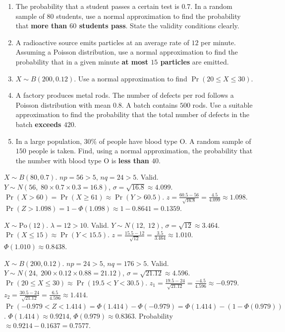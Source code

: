 \documentclass[11pt]{article}
\begin{document}
\begin{exercice}
\begin{enumerate}
\item The probability that a student passes a certain test is $0.7$. In a random sample of $80$ students, use a normal approximation to find the probability that \textbf{more than $60$ students pass}. State the validity conditions clearly.
\item A radioactive source emits particles at an average rate of $12$ per minute. Assuming a Poisson distribution, use a normal approximation to find the probability that in a given minute \textbf{at most $15$ particles} are emitted.
\item $X \sim B(200, 0.12)$. Use a normal approximation to find $\Pr(20 \le X \le 30)$.
\item A factory produces metal rods. The number of defects per rod follows a Poisson distribution with mean $0.8$. A batch contains $500$ rods. Use a suitable approximation to find the probability that the total number of defects in the batch \textbf{exceeds $420$}.
\item In a large population, $30\%$ of people have blood type O. A random sample of $150$ people is taken. Find, using a normal approximation, the probability that the number with blood type O is \textbf{less than $40$}.
\end{enumerate}
\end{exercice}

\begin{corrige}[Exercise 1]
$X \sim B(80, 0.7)$. $np = 56 > 5$, $nq = 24 > 5$. Valid.
$Y \sim N(56,\; 80 \times 0.7 \times 0.3 = 16.8)$, $\sigma = \sqrt{16.8} \approx 4.099$.
$\Pr(X > 60) = \Pr(X \ge 61) \approx \Pr(Y > 60.5)$.
$z = \frac{60.5 - 56}{\sqrt{16.8}} = \frac{4.5}{4.099} \approx 1.098$.
$\Pr(Z > 1.098) = 1 - \Phi(1.098) \approx 1 - 0.8641 = 0.1359$.
\end{corrige}

\begin{corrige}[Exercise 2]
$X \sim \text{Po}(12)$. $\lambda = 12 > 10$. Valid.
$Y \sim N(12,\; 12)$, $\sigma = \sqrt{12} \approx 3.464$.
$\Pr(X \le 15) \approx \Pr(Y < 15.5)$.
$z = \frac{15.5 - 12}{\sqrt{12}} = \frac{3.5}{3.464} \approx 1.010$.
$\Phi(1.010) \approx 0.8438$.
\end{corrige}

\begin{corrige}[Exercise 3]
$X \sim B(200, 0.12)$. $np = 24 > 5$, $nq = 176 > 5$. Valid.
$Y \sim N(24,\; 200 \times 0.12 \times 0.88 = 21.12)$, $\sigma = \sqrt{21.12} \approx 4.596$.
$\Pr(20 \le X \le 30) \approx \Pr(19.5 < Y < 30.5)$.
$z_1 = \frac{19.5 - 24}{\sqrt{21.12}} = \frac{-4.5}{4.596} \approx -0.979$.
$z_2 = \frac{30.5 - 24}{\sqrt{21.12}} = \frac{6.5}{4.596} \approx 1.414$.
$\Pr(-0.979 < Z < 1.414) = \Phi(1.414) - \Phi(-0.979) = \Phi(1.414) - (1 - \Phi(0.979))$.
$\Phi(1.414) \approx 0.9214$, $\Phi(0.979) \approx 0.8363$.
Probability $\approx 0.9214 - 0.1637 = 0.7577$.
\end{corrige}
\end{document}

